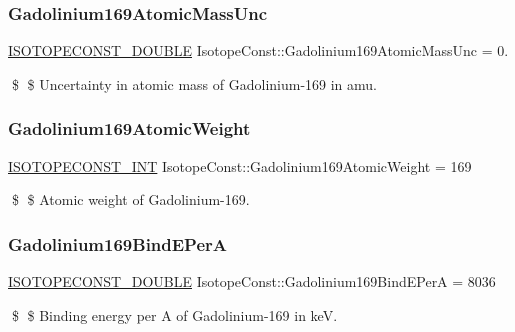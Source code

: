 \subsubsection{\texorpdfstring{Gadolinium169\+Atomic\+Mass\+Unc}{Gadolinium169AtomicMassUnc}}
{\footnotesize\ttfamily \mbox{\hyperlink{group___isotope_const-_macros_ga8f45a7272ce02c0b4c65c44636ed719a}{I\+S\+O\+T\+O\+P\+E\+C\+O\+N\+S\+T\+\_\+\+D\+O\+U\+B\+LE}} Isotope\+Const\+::\+Gadolinium169\+Atomic\+Mass\+Unc = 0.}

\$ \$ Uncertainty in atomic mass of Gadolinium-\/169 in amu. \mbox{\label{group___isotope_const-_gadolinium-_gd169_gad301768d4ce27114f0ce6ccbfe6770c4}} 
\subsubsection{\texorpdfstring{Gadolinium169\+Atomic\+Weight}{Gadolinium169AtomicWeight}}
{\footnotesize\ttfamily \mbox{\hyperlink{group___isotope_const-_macros_ga5f18360b3e99483a35c32d789e62621c}{I\+S\+O\+T\+O\+P\+E\+C\+O\+N\+S\+T\+\_\+\+I\+NT}} Isotope\+Const\+::\+Gadolinium169\+Atomic\+Weight = 169}

\$ \$ Atomic weight of Gadolinium-\/169. \mbox{\label{group___isotope_const-_gadolinium-_gd169_ga029060c1ad5f5a728059bc65265a05a9}} 
\subsubsection{\texorpdfstring{Gadolinium169\+Bind\+E\+PerA}{Gadolinium169BindEPerA}}
{\footnotesize\ttfamily \mbox{\hyperlink{group___isotope_const-_macros_ga8f45a7272ce02c0b4c65c44636ed719a}{I\+S\+O\+T\+O\+P\+E\+C\+O\+N\+S\+T\+\_\+\+D\+O\+U\+B\+LE}} Isotope\+Const\+::\+Gadolinium169\+Bind\+E\+PerA = 8036}

\$ \$ Binding energy per A of Gadolinium-\/169 in keV. \mbox{\label{group___isotope_const-_gadolinium-_gd169_ga38605dd9ba795c66a1b8aa9b2a820d28}} 
